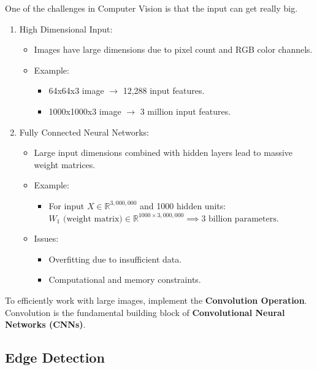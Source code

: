 \documentclass[letterpaper,12pt,notitlepage,twoside]{report}
\begin{document}
One of the challenges in Computer Vision is that the input can get really big.
\begin{enumerate}
    \item High Dimensional Input:
    \begin{itemize}
        \item Images have large dimensions due to pixel count and RGB color channels.
        \item Example:
        \begin{itemize}
            \item 64x64x3 image $\rightarrow$ 12,288 input features.
            \item 1000x1000x3 image $\rightarrow$ 3 million input features.
        \end{itemize}
    \end{itemize}

    \item Fully Connected Neural Networks:
    \begin{itemize}
        \item Large input dimensions combined with hidden layers lead to massive weight matrices.
        \item Example:
        \begin{itemize}
            \item For input $X \in \mathbb{R}^{3,000,000}$ and 1000 hidden units: \\
            $W_1 \text{ (weight matrix)} \in \mathbb{R}^{1000 \times 3,000,000} \implies \text{3 billion parameters}.$
        \end{itemize}
        \item Issues:
        \begin{itemize}
            \item Overfitting due to insufficient data.
            \item Computational and memory constraints.
        \end{itemize}
    \end{itemize}
\end{enumerate}

To efficiently work with large images, implement the \textbf{Convolution Operation}. Convolution is the fundamental building block of \textbf{Convolutional Neural Networks (CNNs)}.

\subsection{Edge Detection}
\end{document}
